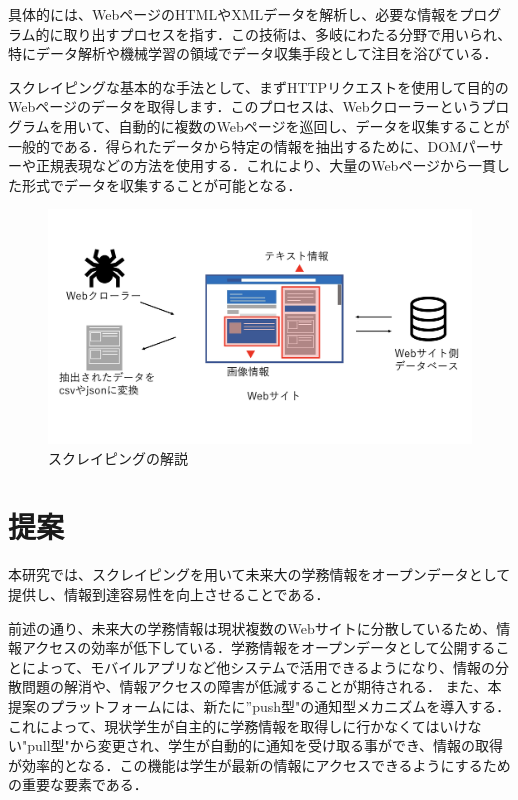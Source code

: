 \documentclass[11pt]{ujarticle}
\begin{document}
具体的には、WebページのHTMLやXMLデータを解析し、必要な情報をプログラム的に取り出すプロセスを指す．この技術は、多岐にわたる分野で用いられ、特にデータ解析や機械学習の領域でデータ収集手段として注目を浴びている．

スクレイピングな基本的な手法として、まずHTTPリクエストを使用して目的のWebページのデータを取得します．このプロセスは、Webクローラーというプログラムを用いて、自動的に複数のWebページを巡回し、データを収集することが一般的である．得られたデータから特定の情報を抽出するために、DOMパーサーや正規表現などの方法を使用する．これにより、大量のWebページから一貫した形式でデータを収集することが可能となる．

\begin{figure}[h]
	\includegraphics[width=0.9\linewidth]{./src/selenium.png}
	\caption{スクレイピングの解説}
  \label{fig:arch}
\end{figure}

\section{提案}

本研究では、スクレイピングを用いて未来大の学務情報をオープンデータとして提供し、情報到達容易性を向上させることである．

前述の通り、未来大の学務情報は現状複数のWebサイトに分散しているため、情報アクセスの効率が低下している．学務情報をオープンデータとして公開することによって、モバイルアプリなど他システムで活用できるようになり、情報の分散問題の解消や、情報アクセスの障害が低減することが期待される．
また、本提案のプラットフォームには、新たに”push型"の通知型メカニズムを導入する．これによって、現状学生が自主的に学務情報を取得しに行かなくてはいけない"pull型"から変更され、学生が自動的に通知を受け取る事ができ、情報の取得が効率的となる．この機能は学生が最新の情報にアクセスできるようにするための重要な要素である．
\end{document}
